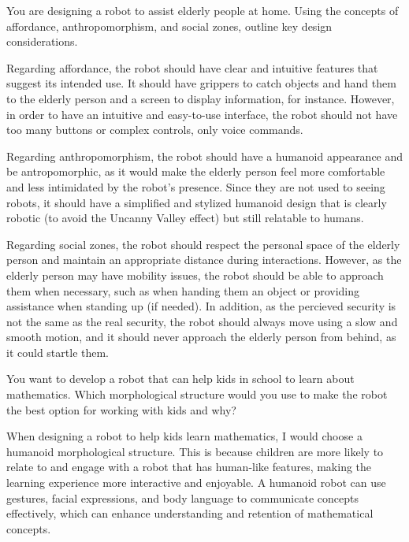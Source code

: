 \begin{ejercicio}
    You are designing a robot to assist elderly people at home. Using the concepts of affordance, anthropomorphism, and social zones, outline key design considerations.

    Regarding affordance, the robot should have clear and intuitive features that suggest its intended use. It should have grippers to catch objects and hand them to the elderly person and a screen to display information, for instance. However, in order to have an intuitive and easy-to-use interface, the robot should not have too many buttons or complex controls, only voice commands.

    Regarding anthropomorphism, the robot should have a humanoid appearance and be antropomorphic, as it would make the elderly person feel more comfortable and less intimidated by the robot's presence. Since they are not used to seeing robots, it should have a simplified and stylized humanoid design that is clearly robotic (to avoid the Uncanny Valley effect) but still relatable to humans.

    Regarding social zones, the robot should respect the personal space of the elderly person and maintain an appropriate distance during interactions. However, as the elderly person may have mobility issues, the robot should be able to approach them when necessary, such as when handing them an object or providing assistance when standing up (if needed). In addition, as the percieved security is not the same as the real security, the robot should always move using a slow and smooth motion, and it should never approach the elderly person from behind, as it could startle them.
\end{ejercicio}

\begin{ejercicio}
    You want to develop a robot that can help kids in school to learn about mathematics. Which morphological structure would you use to make the robot the best option for working with kids and why?

    When designing a robot to help kids learn mathematics, I would choose a humanoid morphological structure. This is because children are more likely to relate to and engage with a robot that has human-like features, making the learning experience more interactive and enjoyable. A humanoid robot can use gestures, facial expressions, and body language to communicate concepts effectively, which can enhance understanding and retention of mathematical concepts.
\end{ejercicio}

